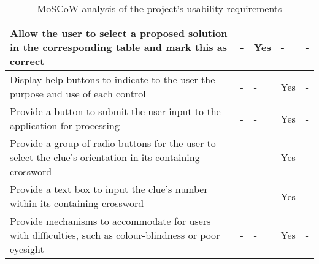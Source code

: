 \begin{table}[H]
\begin{tabular}{|p{9.3cm}|p{1.3cm}|p{1.3cm}|p{1.3cm}|p{1.3cm}|}
    Allow the user to select a proposed solution in the corresponding table and 
    mark this as correct &
    - & Yes & - & - \\ \hline

    Display help buttons to indicate to the user the purpose and use of each 
    control &
    - & - & Yes & - \\ \hline

    Provide a button to submit the user input to the application for processing &
    - & - & Yes & - \\ \hline

    Provide a group of radio buttons for the user to select the clue's orientation
    in its containing crossword &
    - & - & Yes & - \\ \hline

      Provide a text box to input the clue's number within its containing 
      crossword &
    - & - & Yes & - \\ \hline

    Provide mechanisms to accommodate for users with difficulties, such as 
    colour-blindness or poor eyesight &
    - & - & Yes & - \\ \hline

    \end{tabular}
    \caption {MoSCoW analysis of the project's usability requirements}
\end{table}